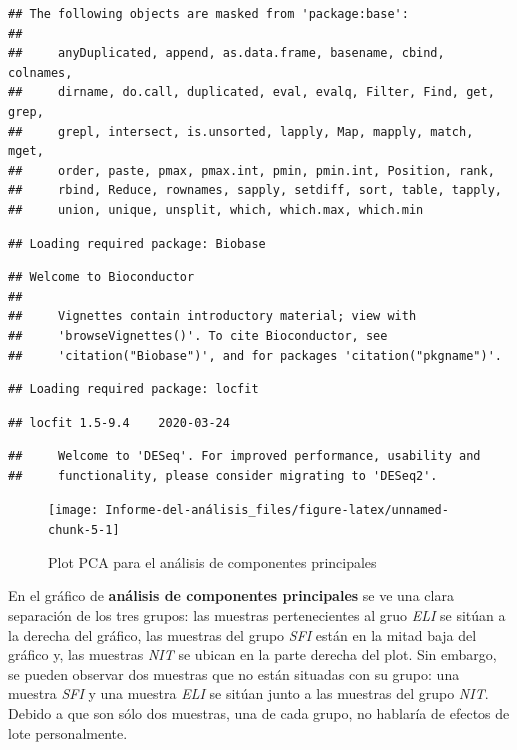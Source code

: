 \documentclass[]{article}
\begin{document}
\begin{verbatim}
## The following objects are masked from 'package:base':
## 
##     anyDuplicated, append, as.data.frame, basename, cbind, colnames,
##     dirname, do.call, duplicated, eval, evalq, Filter, Find, get, grep,
##     grepl, intersect, is.unsorted, lapply, Map, mapply, match, mget,
##     order, paste, pmax, pmax.int, pmin, pmin.int, Position, rank,
##     rbind, Reduce, rownames, sapply, setdiff, sort, table, tapply,
##     union, unique, unsplit, which, which.max, which.min
\end{verbatim}

\begin{verbatim}
## Loading required package: Biobase
\end{verbatim}

\begin{verbatim}
## Welcome to Bioconductor
## 
##     Vignettes contain introductory material; view with
##     'browseVignettes()'. To cite Bioconductor, see
##     'citation("Biobase")', and for packages 'citation("pkgname")'.
\end{verbatim}

\begin{verbatim}
## Loading required package: locfit
\end{verbatim}

\begin{verbatim}
## locfit 1.5-9.4    2020-03-24
\end{verbatim}

\begin{verbatim}
##     Welcome to 'DESeq'. For improved performance, usability and
##     functionality, please consider migrating to 'DESeq2'.
\end{verbatim}

\begin{figure}[H]

{\centering \texttt{[image: Informe-del-análisis\_files/figure-latex/unnamed-chunk-5-1]} 

}

\caption{Plot PCA para el análisis de componentes principales}\label{fig:unnamed-chunk-5}
\end{figure}

En el gráfico de \textbf{análisis de componentes principales} se ve una
clara separación de los tres grupos: las muestras pertenecientes al gruo
\emph{ELI} se sitúan a la derecha del gráfico, las muestras del grupo
\emph{SFI} están en la mitad baja del gráfico y, las muestras \emph{NIT}
se ubican en la parte derecha del plot. Sin embargo, se pueden observar
dos muestras que no están situadas con su grupo: una muestra \emph{SFI}
y una muestra \emph{ELI} se sitúan junto a las muestras del grupo
\emph{NIT}. Debido a que son sólo dos muestras, una de cada grupo, no
hablaría de efectos de lote personalmente.
\end{document}
